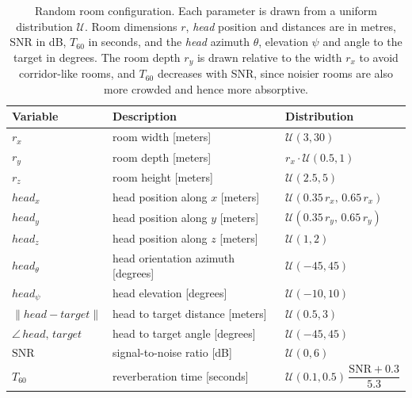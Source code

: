 \begin{table}[htbp]
\centering
\footnotesize
\caption{Random room configuration. Each parameter is drawn from a uniform
distribution $\mathcal{U}$. Room dimensions $r$, \emph{head} position and
distances are in metres, \acrshort{SNR} in dB, $T_{60}$ in seconds, and the
\emph{head} azimuth $\theta$, elevation $\psi$ and angle to the target in
degrees. The room depth $r_{y}$ is drawn relative to the width $r_{x}$ to
avoid corridor-like rooms, and $T_{60}$ decreases with \acrshort{SNR}, since
noisier rooms are also more crowded and hence more absorptive.}
\label{tab:ha_rooms}
\begin{tabular}{@{}lll@{}}
\toprule
Variable & Description & Distribution \\
\midrule
$r_{x}$              & room width [meters]                   & $\mathcal{U}(3, 30)$ \\
$r_{y}$              & room depth [meters]                    & $r_{x} \cdot \mathcal{U}(0.5, 1)$ \\
$r_{z}$              & room height [meters]                   & $\mathcal{U}(2.5, 5)$ \\[2pt]
$head_x$             & head position along $x$ [meters]       & $\mathcal{U}(0.35\,r_{x},\, 0.65\,r_{x})$ \\
$head_y$             & head position along $y$ [meters]       & $\mathcal{U}(0.35\,r_{y},\, 0.65\,r_{y})$ \\
$head_z$             & head position along $z$ [meters]       & $\mathcal{U}(1, 2)$ \\[2pt]
$head_{\theta}$      & head orientation azimuth [degrees]                  & $\mathcal{U}(-45, 45)$ \\
$head_{\psi}$        & head elevation [degrees]                & $\mathcal{U}(-10, 10)$ \\[2pt]
$\lVert head - target \rVert$ & head to target distance [meters] & $\mathcal{U}(0.5, 3)$ \\
$\angle\, head,\, target$     & head to target angle [degrees]    & $\mathcal{U}(-45, 45)$ \\[2pt]
$\mathrm{SNR}$       & signal-to-noise ratio [dB]         & $\mathcal{U}(0, 6)$ \\
$T_{60}$             & reverberation time [seconds]            & $\mathcal{U}(0.1, 0.5)\,\dfrac{\mathrm{SNR} + 0.3}{5.3}$ \\
\bottomrule
\end{tabular}
\end{table}

